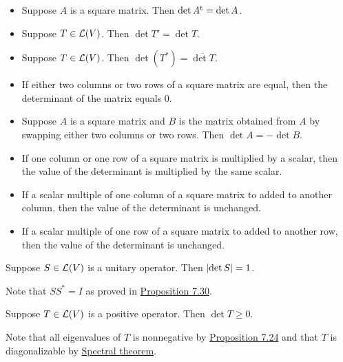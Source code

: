 \documentclass[12pt,a4paper]{article}
\begin{document}
    \begin{prop}
        \hfill
        
        \begin{itemize}
            \item Suppose $A$ is a square matrix. Then $\det A^\mathrm{t}=\det A$.
            \item Suppose $T\in\mathcal{L}(V)$. Then $\det T'=\det T$.
            \item Suppose $T\in\mathcal{L}(V)$. Then $\det(T^*)=\overline{\det T}$.
        \end{itemize}
    \end{prop}
    \hfill

    \begin{prop}
        \hfill

        \begin{itemize}
            \item If either two columns or two rows of a square matrix are equal, then the determinant of the matrix equals $0$.
            \item Suppose $A$ is a square matrix and $B$ is the matrix obtained from $A$ by swapping either two columns or two rows. Then $\det A=-\det B$.
            \item If one column or one row of a square matrix is multiplied by a scalar, then the value of the determinant is multiplied by the same scalar.
            \item If a scalar multiple of one column of a square matrix to added to another column, then the value of the determinant is unchanged.
            \item If a scalar multiple of one row of a square matrix to added to another row, then the value of the determinant is unchanged.
        \end{itemize}
    \end{prop}
    \hfill

    \begin{prop}
        Suppose $S\in\mathcal{L}(V)$ is a unitary operator. Then $\left\lvert \det S\right\rvert=1$.
    \end{prop}
    \begin{remark}
        Note that $SS^*=I$ as proved in \hyperref[7.30]{Proposition 7.30}.
    \end{remark}
    \begin{prop}
        Suppose $T\in\mathcal{L}(V)$ is a positive operator. Then $\det T\geq0$.
    \end{prop}
    \begin{remark}
        Note that all eigenvalues of $T$ is nonnegative by \hyperref[7.24]{Proposition 7.24} and that $T$ is diagonalizable by \hyperref[7.19]{Spectral theorem}.
    \end{remark}
    \hfill
\end{document}
